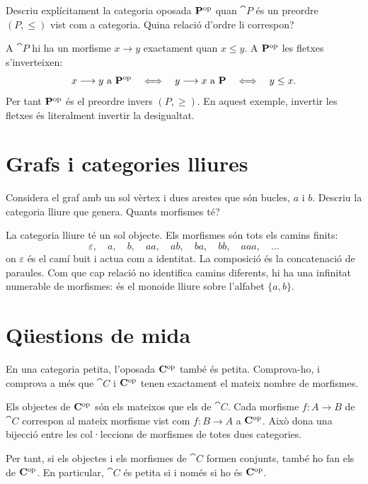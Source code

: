 \begin{exercici}
Descriu explícitament la categoria oposada $\mathbf{P}^{\mathrm{op}}$ quan $\cat{P}$ és un preordre $(P,\leq)$ vist com a categoria. Quina relació d'ordre li correspon?
\end{exercici}

\begin{solucio}
A $\cat{P}$ hi ha un morfisme $x\to y$ exactament quan $x\leq y$. A $\mathbf{P}^{\mathrm{op}}$ les fletxes s'inverteixen:
\[
x\longrightarrow y\text{ a }\mathbf{P}^{\mathrm{op}}
\quad\Longleftrightarrow\quad
y\longrightarrow x\text{ a }\mathbf{P}
\quad\Longleftrightarrow\quad
y\leq x.
\]
Per tant $\mathbf{P}^{\mathrm{op}}$ és el preordre invers $(P,\geq)$. En aquest exemple, invertir les fletxes és literalment invertir la desigualtat.
\end{solucio}

\section{Grafs i categories lliures}

\begin{exercici}
Considera el graf amb un sol vèrtex i dues arestes que són bucles, $a$ i $b$. Descriu la categoria lliure que genera. Quants morfismes té?
\end{exercici}

\begin{solucio}
La categoria lliure té un sol objecte. Els morfismes són tots els camins finits:
\[
\varepsilon,
\quad a,
\quad b,
\quad aa,
\quad ab,
\quad ba,
\quad bb,
\quad aaa,
\quad\ldots
\]
on $\varepsilon$ és el camí buit i actua com a identitat. La composició és la concatenació de paraules. Com que cap relació no identifica camins diferents, hi ha una infinitat numerable de morfismes: és el monoide lliure sobre l'alfabet $\{a,b\}$.
\end{solucio}

\section{Qüestions de mida}

\begin{exercici}
En una categoria petita, l'oposada $\mathbf{C}^{\mathrm{op}}$ també és petita. Comprova-ho, i comprova a més que $\cat{C}$ i $\mathbf{C}^{\mathrm{op}}$ tenen exactament el mateix nombre de morfismes.
\end{exercici}

\begin{solucio}
Els objectes de $\mathbf{C}^{\mathrm{op}}$ són els mateixos que els de $\cat{C}$. Cada morfisme $f\colon A\to B$ de $\cat{C}$ correspon al mateix morfisme vist com $f\colon B\to A$ a $\mathbf{C}^{\mathrm{op}}$. Això dona una bijecció entre les col·leccions de morfismes de totes dues categories.

Per tant, si els objectes i els morfismes de $\cat{C}$ formen conjunts, també ho fan els de $\mathbf{C}^{\mathrm{op}}$. En particular, $\cat{C}$ és petita si i només si ho és $\mathbf{C}^{\mathrm{op}}$.
\end{solucio}